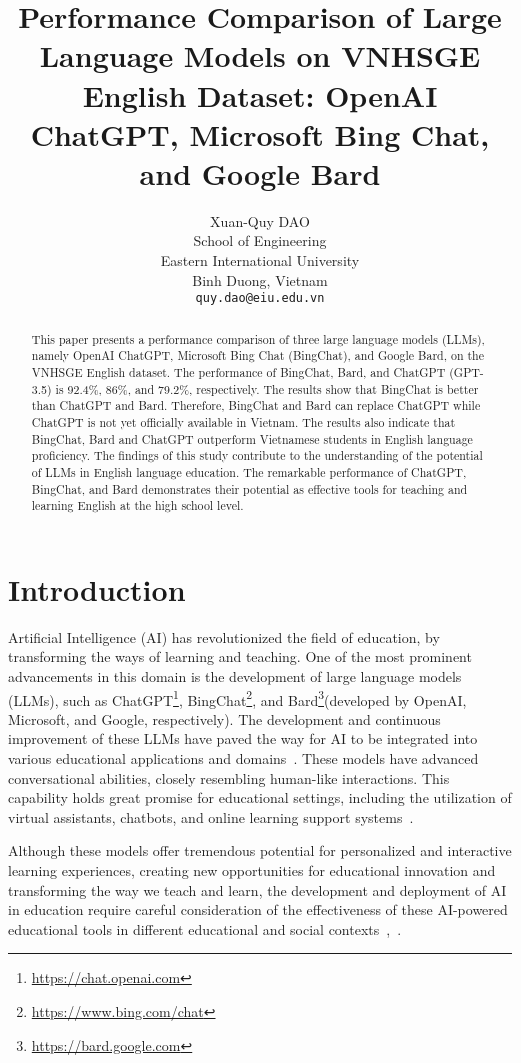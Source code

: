 \documentclass[11pt]{article}
\title{Performance Comparison of Large Language Models on VNHSGE English Dataset: OpenAI ChatGPT, Microsoft Bing Chat, and Google Bard}
\author{Xuan-Quy DAO \\
  School of Engineering \\
  Eastern International University \\
  Binh Duong, Vietnam \\
  \texttt{quy.dao@eiu.edu.vn} \\
}
\begin{document}
\maketitle
\begin{abstract}

This paper presents a performance comparison of three large language models (LLMs), namely OpenAI ChatGPT, Microsoft Bing Chat (BingChat), and Google Bard, on the VNHSGE English dataset. The performance of BingChat, Bard, and ChatGPT (GPT-3.5) is 92.4\%, 86\%, and 79.2\%, respectively. The results show that BingChat is better than ChatGPT and Bard. Therefore, BingChat and Bard can replace ChatGPT while ChatGPT is not yet officially available in Vietnam. The results also indicate that BingChat, Bard and ChatGPT outperform Vietnamese students in English language proficiency. The findings of this study contribute to the understanding of the potential of LLMs in English language education. The remarkable performance of ChatGPT, BingChat, and Bard demonstrates their potential as effective tools for teaching and learning English at the high school level.

\end{abstract}

\section{Introduction}

Artificial Intelligence (AI) has revolutionized the field of education, by transforming the ways of learning and teaching. One of the most prominent advancements in this domain is the development of large language models (LLMs), such as ChatGPT\footnote{\href{https://chat.openai.com/}{https://chat.openai.com}}, BingChat\footnote{\href{https://www.bing.com/chat }{https://www.bing.com/chat}}, and Bard\footnote{\href{https://bard.google.com}{https://bard.google.com}}(developed by OpenAI, Microsoft, and Google, respectively). The development and continuous improvement of these LLMs have paved the way for AI to be integrated into various educational applications and domains~\cite{OpenAI_gpt_4_report}. These models have advanced conversational abilities, closely resembling human-like interactions. This capability holds great promise for educational settings, including the utilization of virtual assistants, chatbots, and online learning support systems~\cite{kasneci2023chatgpt}. 

Although these models offer tremendous potential for personalized and interactive learning experiences, creating new opportunities for educational innovation and transforming the way we teach and learn, the development and deployment of AI in education require careful consideration of the effectiveness of these AI-powered educational tools in different educational and social contexts~\cite{kung2023performance},~\cite{thorp2023chatgpt}.
\end{document}
